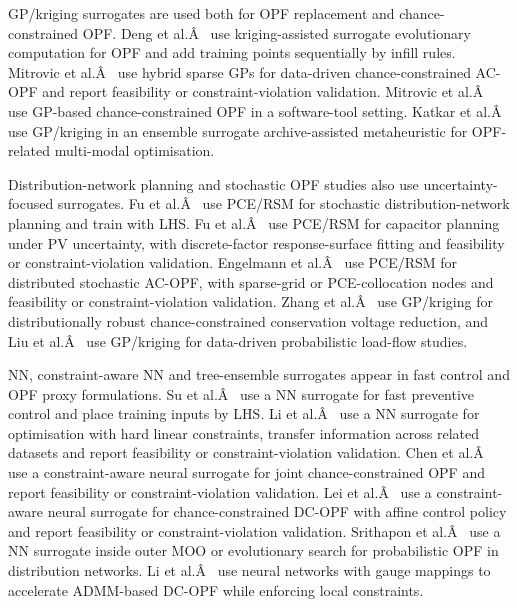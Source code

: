 GP/kriging surrogates are used both for OPF replacement and
chance-constrained OPF. Deng et al.Â~\cite{Deng2020831} use kriging-assisted
surrogate evolutionary computation for OPF and add training points
sequentially by infill rules. Mitrovic et al.Â~\cite{Mitrovic2023__2} use
hybrid sparse GPs for data-driven chance-constrained AC-OPF and report
feasibility or constraint-violation validation. Mitrovic et
al.Â~\cite{Mitrovic2023__3} use GP-based chance-constrained OPF in a
software-tool setting. Katkar et al.Â~\cite{Katkar2025} use GP/kriging in an
ensemble surrogate archive-assisted metaheuristic for OPF-related
multi-modal optimisation.

Distribution-network planning and stochastic OPF studies also use
uncertainty-focused surrogates. Fu et al.Â~\cite{Fu20202904} use PCE/RSM for
stochastic distribution-network planning and train with LHS. Fu et
al.Â~\cite{Fu2022} use PCE/RSM for capacitor planning under PV uncertainty,
with discrete-factor response-surface fitting and feasibility or
constraint-violation validation. Engelmann et al.Â~\cite{Engelmann20186188}
use PCE/RSM for distributed stochastic AC-OPF, with sparse-grid or
PCE-collocation nodes and feasibility or constraint-violation
validation. Zhang et al.Â~\cite{Zhang2024821} use GP/kriging for
distributionally robust chance-constrained conservation voltage
reduction, and Liu et al.Â~\cite{Liu20222679} use GP/kriging for data-driven
probabilistic load-flow studies.

NN, constraint-aware NN and tree-ensemble surrogates appear in fast
control and OPF proxy formulations. Su et al.Â~\cite{Su2022315} use a NN
surrogate for fast preventive control and place training inputs by LHS.
Li et al.Â~\cite{Li202359995} use a NN surrogate for optimisation with hard
linear constraints, transfer information across related datasets and
report feasibility or constraint-violation validation. Chen et
al.Â~\cite{Chen2023657} use a constraint-aware neural surrogate for joint
chance-constrained OPF and report feasibility or constraint-violation
validation. Lei et al.Â~\cite{Lei20247417} use a constraint-aware neural
surrogate for chance-constrained DC-OPF with affine control policy and
report feasibility or constraint-violation validation. Srithapon et
al.Â~\cite{Srithapon202134395} use a NN surrogate inside outer MOO or
evolutionary search for probabilistic OPF in distribution networks. Li
et al.Â~\cite{Li2023__2} use neural networks with gauge mappings to
accelerate ADMM-based DC-OPF while enforcing local constraints.

